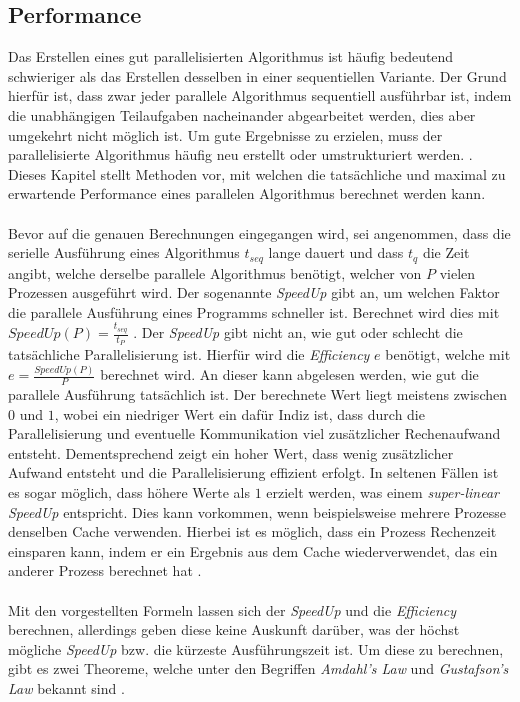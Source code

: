\subsection{Performance}
\label{subsec:basics_performance}
Das Erstellen eines gut parallelisierten Algorithmus ist häufig bedeutend schwieriger als das Erstellen desselben in einer sequentiellen Variante. Der Grund hierfür ist, dass zwar jeder parallele Algorithmus sequentiell ausführbar ist, indem die unabhängigen Teilaufgaben nacheinander abgearbeitet werden, dies aber umgekehrt nicht möglich ist. Um gute Ergebnisse zu erzielen, muss der parallelisierte Algorithmus häufig neu erstellt oder umstrukturiert werden. \cite{nielsen2016introduction}. Dieses Kapitel stellt Methoden vor, mit welchen die tatsächliche und maximal zu erwartende Performance eines parallelen Algorithmus berechnet werden kann. 
\\\\
Bevor auf die genauen Berechnungen eingegangen wird, sei angenommen, dass die serielle Ausführung eines Algorithmus $t_{seq}$ lange dauert und dass $t_q$ die Zeit angibt, welche derselbe parallele Algorithmus benötigt, welcher von $P$ vielen Prozessen ausgeführt wird. Der sogenannte \emph{SpeedUp} gibt an, um welchen Faktor die parallele Ausführung eines Programms schneller ist. Berechnet wird dies mit $SpeedUp(P)=\frac{t_{seq}}{t_P}$ \cite{nielsen2016introduction}. Der \emph{SpeedUp} gibt nicht an, wie gut oder schlecht die tatsächliche Parallelisierung ist. Hierfür wird die \emph{Efficiency} $e$ benötigt, welche mit $e=\frac{SpeedUp(P)}{P}$ berechnet wird. An dieser kann abgelesen werden, wie gut die parallele Ausführung tatsächlich ist. Der berechnete Wert liegt meistens zwischen $0$ und $1$, wobei ein niedriger Wert ein dafür Indiz ist, dass durch die Parallelisierung und eventuelle Kommunikation viel zusätzlicher Rechenaufwand entsteht. Dementsprechend zeigt ein hoher Wert, dass wenig zusätzlicher Aufwand entsteht und die Parallelisierung effizient erfolgt. In seltenen Fällen ist es sogar möglich, dass höhere Werte als $1$ erzielt werden, was einem \emph{super-linear SpeedUp} entspricht. Dies kann vorkommen, wenn beispielsweise mehrere Prozesse denselben Cache verwenden. Hierbei ist es möglich, dass ein Prozess Rechenzeit einsparen kann, indem er ein Ergebnis aus dem Cache wiederverwendet, das ein anderer Prozess berechnet hat \cite{nielsen2016introduction}.
\\\\
Mit den vorgestellten Formeln lassen sich der \emph{SpeedUp} und die \emph{Efficiency} berechnen, allerdings geben diese keine Auskunft darüber, was der höchst mögliche \emph{SpeedUp} bzw. die kürzeste Ausführungszeit ist. Um diese zu berechnen, gibt es zwei Theoreme, welche unter den Begriffen \emph{Amdahl's Law} und \emph{Gustafson's Law} bekannt sind \cite{nielsen2016introduction}. 
